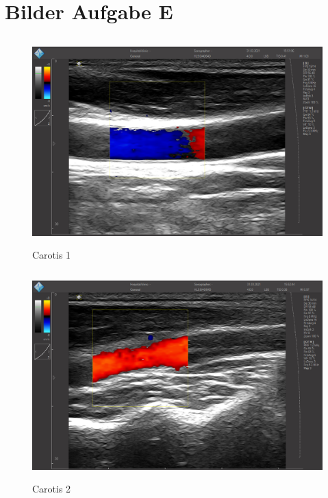 \documentclass[11pt]{scrartcl}
\begin{document}
    \section{Bilder Aufgabe E}

    \begin{figure}[H]
        \centering
        \includegraphics[height=8cm]{images/E1_e}
        \caption{Carotis 1}
        \label{fig:carotis1}
    \end{figure}

    \begin{figure}[H]
        \centering
        \includegraphics[height=8cm]{images/E2_e}
        \caption{Carotis 2}
        \label{fig:carotis2}
    \end{figure}
\end{document}
